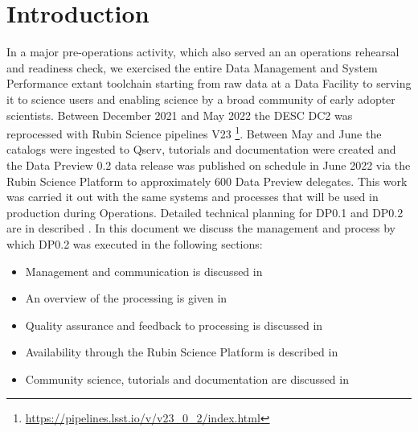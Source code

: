 \section{Introduction}\label{sec:intro}

In a major pre-operations activity, which also served an an operations rehearsal and readiness check, we exercised the entire Data Management and System Performance extant toolchain starting from raw data at a Data Facility to serving it to science users and enabling science by a broad community of early adopter scientists. 
Between December 2021 and May 2022 the DESC DC2 \citep{2021ApJS..253...31L} was reprocessed with Rubin Science pipelines V23 \footnote{\url{https://pipelines.lsst.io/v/v23_0_2/index.html}}.
Between May and June the catalogs were ingested to Qserv, tutorials and documentation were created and the Data Preview 0.2 data release was published on schedule in June 2022 via the Rubin Science Platform to approximately 600 Data Preview delegates.
This work was carried it out with the same systems and processes that will be used in production during Operations.
Detailed technical planning for DP0.1 and DP0.2 are in described .
In this document we discuss the management and process by which DP0.2 was executed in the following sections:

\begin{itemize}
\item Management and communication is discussed in 
\item An overview of the processing is given in 
\item Quality assurance and feedback to processing is discussed in  
\item Availability through the Rubin Science Platform is described in 
\item Community science, tutorials and documentation are discussed in 
\end{itemize}
 